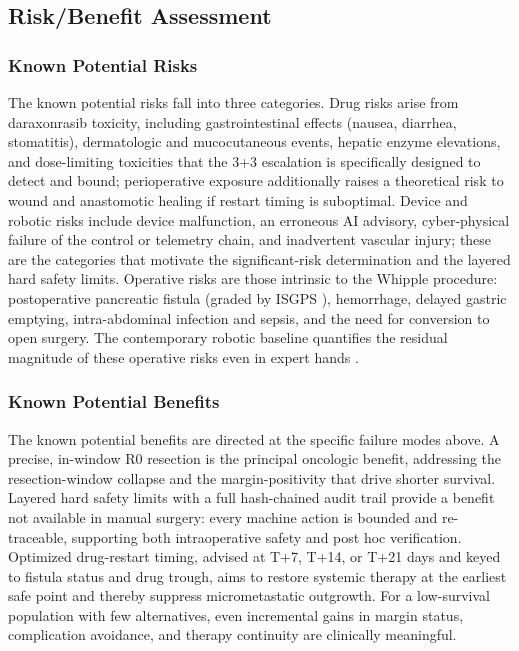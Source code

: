 \subsection{Risk/Benefit Assessment}

\subsubsection{Known Potential Risks}

The known potential risks fall into three categories. Drug risks arise from
daraxonrasib toxicity, including gastrointestinal effects (nausea, diarrhea,
stomatitis), dermatologic and mucocutaneous events, hepatic enzyme elevations,
and dose-limiting toxicities that the 3+3 escalation is specifically designed to
detect and bound; perioperative exposure additionally raises a theoretical risk
to wound and anastomotic healing if restart timing is suboptimal. Device and
robotic risks include device malfunction, an erroneous AI advisory, cyber-physical
failure of the control or telemetry chain, and inadvertent vascular injury; these
are the categories that motivate the significant-risk determination and the
layered hard safety limits. Operative risks are those intrinsic to the Whipple
procedure: postoperative pancreatic fistula (graded by ISGPS \cite{Bassi2017}),
hemorrhage, delayed gastric emptying, intra-abdominal infection and sepsis, and
the need for conversion to open surgery. The contemporary robotic baseline
quantifies the residual magnitude of these operative risks even in expert hands
\cite{DutchCohort2025}.

\vspace{-0.2cm}

\subsubsection{Known Potential Benefits}

The known potential benefits are directed at the specific failure modes above. A
precise, in-window R0 resection is the principal oncologic benefit, addressing the
resection-window collapse and the margin-positivity that drive shorter survival.
Layered hard safety limits with a full hash-chained audit trail provide a
benefit not available in manual surgery: every machine action is bounded and
re-traceable, supporting both intraoperative safety and post hoc verification.
Optimized drug-restart timing, advised at T+7, T+14, or T+21 days and keyed to
fistula status and drug trough, aims to restore systemic therapy at the earliest
safe point and thereby suppress micrometastatic outgrowth. For a low-survival
population with few alternatives, even incremental gains in margin status,
complication avoidance, and therapy continuity are clinically meaningful.

